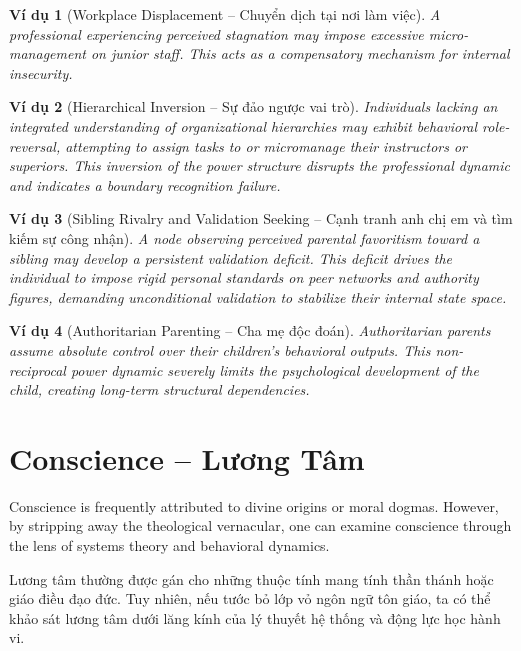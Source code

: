 \documentclass{report}
\newtheorem{vidu}{Ví dụ}
\begin{document}
\begin{vidu}[Workplace Displacement -- Chuyển dịch tại nơi làm việc]
    A professional experiencing perceived stagnation may impose excessive micro-management on junior staff. This acts as a compensatory mechanism for internal insecurity.
\end{vidu}

\begin{vidu}[Hierarchical Inversion -- Sự đảo ngược vai trò]
    Individuals lacking an integrated understanding of organizational hierarchies may exhibit behavioral role-reversal, attempting to assign tasks to or micromanage their instructors or superiors. This inversion of the power structure disrupts the professional dynamic and indicates a boundary recognition failure.
\end{vidu}

\begin{vidu}[Sibling Rivalry and Validation Seeking -- Cạnh tranh anh chị em và tìm kiếm sự công nhận]
    A node observing perceived parental favoritism toward a sibling may develop a persistent validation deficit. This deficit drives the individual to impose rigid personal standards on peer networks and authority figures, demanding unconditional validation to stabilize their internal state space.
\end{vidu}

\begin{vidu}[Authoritarian Parenting -- Cha mẹ độc đoán]
    Authoritarian parents assume absolute control over their children's behavioral outputs. This non-reciprocal power dynamic severely limits the psychological development of the child, creating long-term structural dependencies.
\end{vidu}


\chapter{Conscience -- Lương Tâm}

Conscience is frequently attributed to divine origins or moral dogmas. However, by stripping away the theological vernacular, one can examine conscience through the lens of systems theory and behavioral dynamics.

Lương tâm thường được gán cho những thuộc tính mang tính thần thánh hoặc giáo điều đạo đức. Tuy nhiên, nếu tước bỏ lớp vỏ ngôn ngữ tôn giáo, ta có thể khảo sát lương tâm dưới lăng kính của lý thuyết hệ thống và động lực học hành vi.
\end{document}
